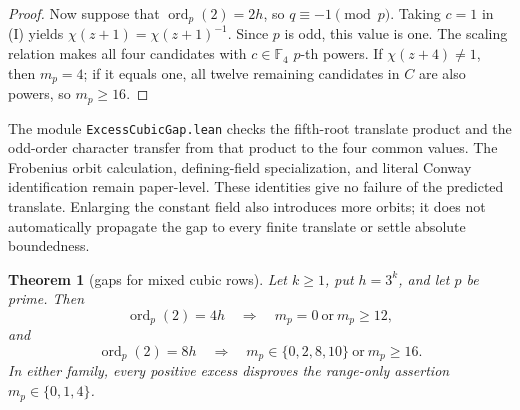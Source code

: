 \documentclass[11pt]{article}
\newtheorem{theorem}{Theorem}[section]
\theoremstyle{definition}
\theoremstyle{remark}
\begin{document}
\begin{proof}
Now suppose that $\operatorname{ord}_p(2)=2h$, so $q\equiv-1\pmod p$.
Taking $c=1$ in (I) yields
$\chi(z+1)=\chi(z+1)^{-1}$.  Since $p$ is odd, this value is one.
The scaling relation makes all four candidates with $c\in\mathbb F_4$
$p$-th powers.  If $\chi(z+4)\ne1$, then $m_p=4$; if it equals one,
all twelve remaining candidates in $C$ are also powers, so $m_p\geq16$.
\end{proof}

The module \texttt{ExcessCubicGap.lean} checks the fifth-root translate
product and the odd-order character transfer from that product to the
four common values.  The Frobenius orbit calculation, defining-field
specialization, and literal Conway identification remain paper-level.
These identities give no failure of the predicted translate.  Enlarging
the constant field also introduces more orbits; it does not automatically
propagate the gap to every finite translate or settle absolute boundedness.

\begin{theorem}[gaps for mixed cubic rows]
\label{thm:mixed-cubic-gap}
Let $k\geq1$, put $h=3^k$, and let $p$ be prime. Then
\[
 \operatorname{ord}_p(2)=4h
 \quad\Longrightarrow\quad m_p=0\ \text{or}\ m_p\geq12,
\]
and
\[
 \operatorname{ord}_p(2)=8h
 \quad\Longrightarrow\quad
 m_p\in\{0,2,8,10\}\ \text{or}\ m_p\geq16.
\]
In either family, every positive excess disproves the range-only assertion
$m_p\in\{0,1,4\}$.
\end{theorem}
\end{document}
